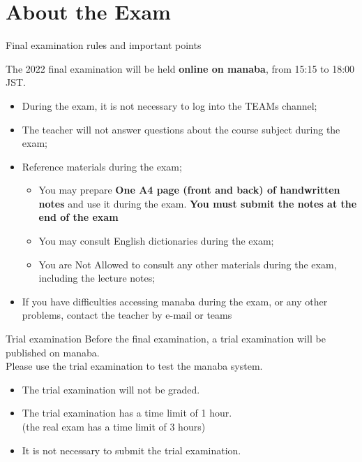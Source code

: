 \section{About the Exam}

\begin{frame}[t]{Final examination rules and important points}

  The 2022 final examination will be held {\bf online on manaba}, from 15:15 to 18:00 JST.

  \begin{itemize}
    \item During the exam, it is not necessary to log into the TEAMs channel;\vfill

    \item The teacher will not answer questions about the course subject during the exam;\vfill

    \item Reference materials during the exam;
    \begin{itemize}
        \item You may prepare {\bf One A4 page (front and back) of handwritten notes} and use it during the exam. {\bf You must submit the notes at the end of the exam}
        \item You may consult English dictionaries during the exam;
        \item You are \alert{Not Allowed} to consult any other materials during the exam, including the lecture notes;
    \end{itemize}\vfill

    \item If you have difficulties accessing manaba during the exam, or any other problems, contact the teacher by e-mail or teams
  \end{itemize}
\end{frame}

\begin{frame}[t]{Trial examination}
  Before the final examination, a trial examination will be published on manaba.\\
  Please use the trial examination to test the manaba system.\bigskip

  \begin{itemize}
    \item The trial examination will not be graded.
    \item The trial examination has a time limit of 1 hour.\\
     (the real exam has a time limit of 3 hours)
    \item It is not necessary to submit the trial examination.
  \end{itemize}
\end{frame}
